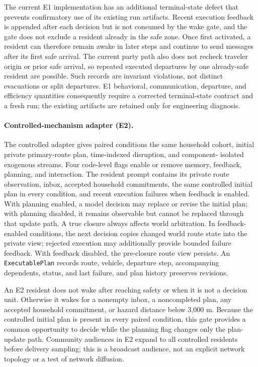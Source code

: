 \documentclass[journal]{IEEEtran}
\begin{document}
The current E1 implementation has an additional terminal-state defect that
prevents confirmatory use of its existing run artifacts. Recent execution
feedback is appended after each decision but is not consumed by the wake gate,
and the gate does not exclude a resident already in the safe zone. Once first
activated, a resident can therefore remain awake in later steps and continue to
send messages after its first safe arrival. The current party path also does not
recheck traveler origin or prior safe arrival, so repeated executed departures
by one already-safe resident are possible. Such records are invariant
violations, not distinct evacuations or split departures. E1 behavioral,
communication, departure, and efficiency quantities consequently require a
corrected terminal-state contract and a fresh run; the existing artifacts are
retained only for engineering diagnosis.

\paragraph{Controlled-mechanism adapter (E2).}
The controlled adapter gives paired conditions the same household cohort,
initial private primary-route plan, time-indexed disruption, and component-
isolated exogenous streams. Four code-level flags enable or remove memory,
feedback, planning, and interaction. The resident prompt contains its private
route observation, inbox, accepted household commitments, the same controlled
initial plan in every condition, and recent execution failures when feedback is
enabled. With planning enabled, a model decision may replace or revise the
initial plan; with planning disabled, it remains observable but cannot be
replaced through that update path. A true closure always affects world
arbitration. In feedback-enabled conditions, the next decision copies changed
world route state into the private view; rejected execution may additionally
provide bounded failure feedback. With feedback disabled, the pre-closure route
view persists. An \texttt{ExecutablePlan} records route,
vehicle, departure step, accompanying dependents, status, and last failure, and
plan history preserves revisions.

An E2 resident does not wake after reaching safety or when it is not a decision
unit. Otherwise it wakes for a nonempty inbox, a noncompleted plan, any accepted
household commitment, or hazard distance below 3,000 m. Because the controlled
initial plan is present in every paired condition, this gate provides a common
opportunity to decide while the planning flag changes only the plan-update
path. Community audiences in E2 expand to all controlled residents before
delivery sampling; this is a broadcast audience, not an explicit network
topology or a test of network diffusion.
\end{document}
